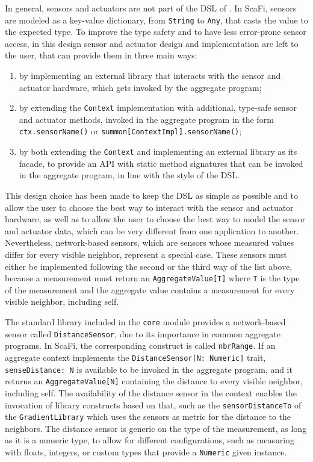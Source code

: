 In general, sensors and actuators are not part of the \ac{DSL} of \this.
%
In ScaFi, sensors are modeled as a key-value dictionary, from \texttt{String} to \texttt{Any}, that casts the value to the expected type.
%
To improve the type safety and to have less error-prone sensor access, in this design sensor and actuator design and implementation are left to the user, that can provide them in three main ways:
\begin{enumerate}
    \item by implementing an external library that interacts with the sensor and actuator hardware, which gets invoked by the aggregate program;
    \item by extending the \texttt{Context} implementation with additional, type-safe sensor and actuator methods, invoked in the aggregate program in the form \texttt{ctx.sensorName()} or \texttt{summon[ContextImpl].sensorName()};
    \item by both extending the \texttt{Context} and implementing an external library as its facade, to provide an \ac{API} with static method signatures that can be invoked in the aggregate program, in line with the style of the \ac{DSL}.
\end{enumerate}
%
This design choice has been made to keep the \ac{DSL} as simple as possible and to allow the user to choose the best way to interact with the sensor and actuator hardware, as well as to allow the user to choose the best way to model the sensor and actuator data, which can be very different from one application to another.
%
Nevertheless, network-based sensors, which are sensors whose measured values differ for every visible neighbor, represent a special case.
%
These sensors must either be implemented following the second or the third way of the list above, because a measurement must return an \texttt{AggregateValue[T]} where \texttt{T} is the type of the measurement and the aggregate value contains a measurement for every visible neighbor, including self.

The standard library included in the \texttt{core} module provides a network-based sensor called \texttt{DistanceSensor}, due to its importance in common aggregate programs.
%
In ScaFi, the corresponding construct is called \texttt{nbrRange}.
%
If an aggregate context implements the \texttt{DistanceSensor[N: Numeric]} trait, \texttt{senseDistance: N} is available to be invoked in the aggregate program, and it returns an \texttt{AggregateValue[N]} containing the distance to every visible neighbor, including self.
%
The availability of the distance sensor in the context enables the invocation of library constructs based on that, such as the \texttt{sensorDistanceTo} of the \texttt{GradientLibrary} which uses the sensors as metric for the distance to the neighbors.
%
The distance sensor is generic on the type of the measurement, as long as it is a numeric type, to allow for different configurations, such as measuring with floats, integers, or custom types that provide a \texttt{Numeric} given instance.


